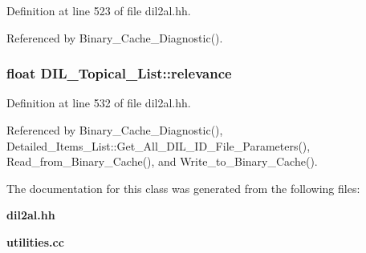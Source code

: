 Definition at line 523 of file dil2al.hh.

Referenced by Binary\_\-Cache\_\-Diagnostic().
\subsubsection{\setlength{\rightskip}{0pt plus 5cm}float DIL\_\-Topical\_\-List::relevance}\label{classDIL__Topical__List_m1}




Definition at line 532 of file dil2al.hh.

Referenced by Binary\_\-Cache\_\-Diagnostic(), Detailed\_\-Items\_\-List::Get\_\-All\_\-DIL\_\-ID\_\-File\_\-Parameters(), Read\_\-from\_\-Binary\_\-Cache(), and Write\_\-to\_\-Binary\_\-Cache().

The documentation for this class was generated from the following files:\begin{CompactItemize}
\item 
{\bf dil2al.hh}\item 
{\bf utilities.cc}\end{CompactItemize}
